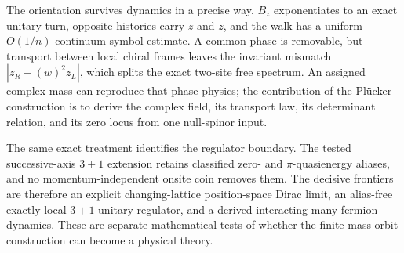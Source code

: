 \documentclass[11pt]{article}
\begin{document}
The orientation survives dynamics in a precise way.  $B_z$ exponentiates to an
exact unitary turn, opposite histories carry $z$ and $\bar z$, and the walk has
a uniform $O(1/n)$ continuum-symbol estimate.  A common phase is removable,
but transport between local chiral frames leaves the invariant mismatch
$|z_R-(\overline w)^2z_L|$, which splits the exact two-site free spectrum.
An assigned complex mass can reproduce that phase physics; the contribution of
the Pl\"ucker construction is to derive the complex field, its transport law,
its determinant relation, and its zero locus from one null-spinor input.

The same exact treatment identifies the regulator boundary.  The tested
successive-axis $3+1$ extension retains classified zero- and
$\pi$-quasienergy aliases, and no momentum-independent onsite coin removes
them.  The decisive frontiers are therefore an explicit changing-lattice
position-space Dirac limit, an alias-free exactly local $3+1$ unitary
regulator, and a derived interacting many-fermion dynamics.  These are
separate mathematical tests of whether the finite mass-orbit construction can
become a physical theory.
\end{document}
